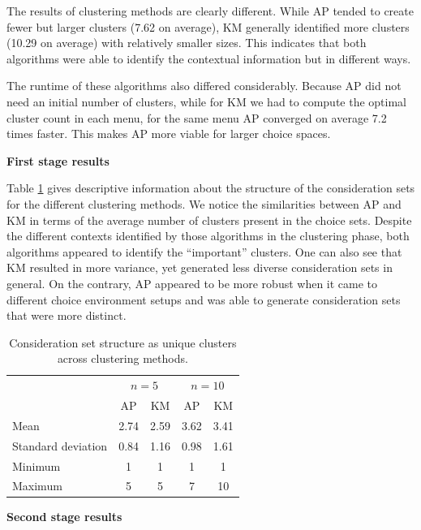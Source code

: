 \documentclass[a4paper,12pt]{article}
\begin{document}
The results of clustering methods are clearly different. While AP tended to create fewer but larger clusters (7.62 on average), KM generally identified more clusters (10.29 on average)  with relatively smaller sizes. This indicates that both algorithms were able to identify the contextual information but in different ways. 

The runtime of these algorithms also differed considerably. Because AP did not need an initial number of clusters, while for KM we had to compute the optimal cluster count in each menu, for the same menu AP converged on average 7.2 times faster. This makes AP more viable for larger choice spaces.

\textbf{First stage results}

Table \ref{tab:desciptiveResultsTwoStageChoiceModelFirstStage} gives descriptive information about the structure of the consideration sets for the different clustering methods. We notice the similarities between AP and KM in terms of the average number of clusters present in the choice sets. Despite the different contexts identified by those algorithms in the clustering phase, both algorithms appeared to identify the ``important'' clusters. One can also see that KM resulted in more variance, yet generated less diverse consideration sets in general. On the contrary, AP appeared to be more robust when it came to different choice environment setups and was able to generate consideration sets that were more distinct. 


\begin{table}[!h]
    \centering
    \begin{tabular}{lcccc}\hline
     & \multicolumn{2}{c}{$n=5$} & \multicolumn{2}{c}{$n=10$}\\
     & AP & KM & AP & KM\\\hline
    Mean & 2.74 & 2.59 & 3.62 & 3.41\\
    Standard deviation\hspace{5mm} & 0.84 & 1.16 & 0.98 & 1.61\\
    Minimum & 1 & 1 & 1 & 1\\
    Maximum & 5 & 5 & 7 & 10\\\hline
    \end{tabular}
    \caption{Consideration set structure as unique clusters across clustering methods.}
    \label{tab:desciptiveResultsTwoStageChoiceModelFirstStage}
\end{table}

\textbf{Second stage results}
\end{document}

